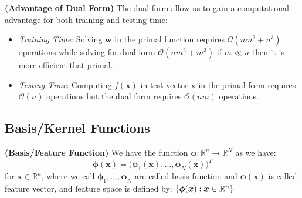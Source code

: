 \begin{remark}{\textbf{(Advantage of Dual Form)}}
    The dual form allow us to gain a computational advantage for both training and testing time:
    \begin{itemize}
        \item \emph{Training Time}: Solving $\boldsymbol w$ in the primal function requires $\mathcal{O}(mn^2 + n^3)$ operations while solving for dual form $\mathcal{O}(nm^2 + m^3)$ if $m\ll n$ then it is more efficient that primal. 
        \item \emph{Testing Time}: Computing $f(\boldsymbol x)$ in test vector $\boldsymbol x$ in the primal form requires $\mathcal{O}(n)$ operations but the dual form requires $\mathcal{O}(nm)$ operations.
    \end{itemize} 
\end{remark}

\subsection{Basis/Kernel Functions}

\begin{definition}{\textbf{(Basis/Feature Function)}}
    We have the function $\boldsymbol \phi : \mathbb{R}^n\rightarrow \mathbb{R}^N$ as we have:
    \begin{equation*}
        \boldsymbol \phi(\boldsymbol x) = \Big( \boldsymbol \phi_1(\boldsymbol x),\dots, \boldsymbol \phi_N(\boldsymbol x) \Big)^T
    \end{equation*} 
    for $\boldsymbol x\in \mathbb{R}^n$, where we call $\boldsymbol \phi_1,\dots,\boldsymbol \phi_N$ are called basis function and $\boldsymbol \phi(\boldsymbol x)$ is called feature vector, and feature space is defined by: $\left\{ \boldsymbol \phi(\boldsymbol x) : \boldsymbol x \in \mathbb{R}^n \right\}$
\end{definition}

